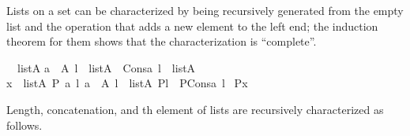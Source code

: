 Lists on a set  can be characterized by being
recursively generated from the empty list \isa{{\isacharbrackleft}{\kern0pt}{\isacharbrackright}{\kern0pt}} and the
operation  that adds a new element to the left end;
the induction theorem for them shows that the characterization is
“complete”.%
\begin{isabelle}%
{\isacharbrackleft}{\kern0pt}{\isacharbrackright}{\kern0pt}\ {\isasymin}\ list{\isacharparenleft}{\kern0pt}A{\isacharparenright}{\kern0pt}\isasep\isanewline%
{\isasymlbrakk}a\ {\isasymin}\ A{\isacharsemicolon}{\kern0pt}\ l\ {\isasymin}\ list{\isacharparenleft}{\kern0pt}A{\isacharparenright}{\kern0pt}{\isasymrbrakk}\ {\isasymLongrightarrow}\ Cons{\isacharparenleft}{\kern0pt}a{\isacharcomma}{\kern0pt}\ l{\isacharparenright}{\kern0pt}\ {\isasymin}\ list{\isacharparenleft}{\kern0pt}A{\isacharparenright}{\kern0pt}\isasep\isanewline%
{\isasymlbrakk}x\ {\isasymin}\ list{\isacharparenleft}{\kern0pt}A{\isacharparenright}{\kern0pt}{\isacharsemicolon}{\kern0pt}\ P{\isacharparenleft}{\kern0pt}{\isacharbrackleft}{\kern0pt}{\isacharbrackright}{\kern0pt}{\isacharparenright}{\kern0pt}{\isacharsemicolon}{\kern0pt}\ {\isasymAnd}a\ l{\isachardot}{\kern0pt}\ {\isasymlbrakk}a\ {\isasymin}\ A{\isacharsemicolon}{\kern0pt}\ l\ {\isasymin}\ list{\isacharparenleft}{\kern0pt}A{\isacharparenright}{\kern0pt}{\isacharsemicolon}{\kern0pt}\ P{\isacharparenleft}{\kern0pt}l{\isacharparenright}{\kern0pt}{\isasymrbrakk}\ {\isasymLongrightarrow}\ P{\isacharparenleft}{\kern0pt}Cons{\isacharparenleft}{\kern0pt}a{\isacharcomma}{\kern0pt}\ l{\isacharparenright}{\kern0pt}{\isacharparenright}{\kern0pt}{\isasymrbrakk}\isanewline
{\isasymLongrightarrow}\ P{\isacharparenleft}{\kern0pt}x{\isacharparenright}{\kern0pt}%
\end{isabelle}%
Length, concatenation, and th element of lists are
recursively characterized as follows.%
